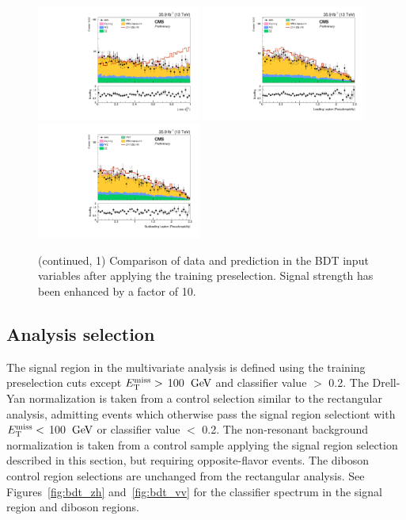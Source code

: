 \begin{figure}[htbp]
\begin{center}
\includegraphics[width=0.48\textwidth]{figures/mva_abs_cos_theta_CS_l1_nice.pdf}
\includegraphics[width=0.48\textwidth]{figures/mva_abs_etal1_nice.pdf}
\includegraphics[width=0.48\textwidth]{figures/mva_abs_etal2_nice.pdf}
\caption{(continued, 1) Comparison of data and prediction in the BDT input variables after applying the training preselection. Signal strength has been enhanced by a factor of 10.}
\label{fig:bdt_inputvar_histos2}
\end{center}
\end{figure}

\subsection{Analysis selection} 

The signal region in the multivariate analysis is defined using the training preselection cuts except $E_\mathrm{T}^{\mathrm{miss}} >$ 100 $\,\text{Ge\hspace{-.08em}V}$ and classifier value $>$ 0.2. 
The Drell-Yan normalization is taken from a control selection similar to the rectangular analysis, admitting events which otherwise pass the signal region selectiont with $E_\mathrm{T}^{\mathrm{miss}} <$ 100 $\,\text{Ge\hspace{-.08em}V}$ or classifier value $<$ 0.2.
The non-resonant background normalization is taken from a control sample applying the signal region selection 
described in this section, but requiring opposite-flavor events. The diboson control region 
selections are unchanged from the rectangular analysis. See Figures~\ref{fig:bdt_zh} 
and~\ref{fig:bdt_vv} for the classifier spectrum in the signal region and diboson regions.

